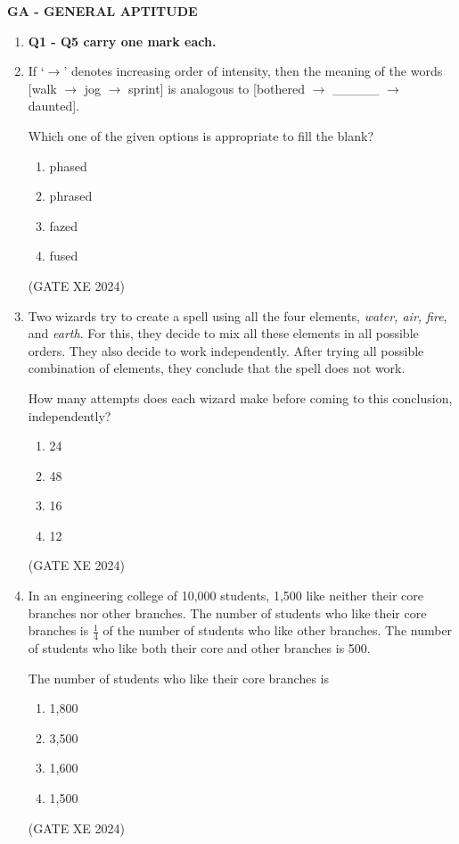 \documentclass[12pt]{article}
\begin{document}
\begin{center}
    {\Large \textbf{GA - GENERAL APTITUDE}}
\end{center}



\begin{enumerate}

\item[] \textbf{Q1 - Q5 carry one mark each.}
\item If `$\rightarrow$' denotes increasing order of intensity, then the meaning of the words [walk $\rightarrow$ jog $\rightarrow$ sprint] is analogous to [bothered $\rightarrow$ \_\_\_\_\_ $\rightarrow$ daunted].  

Which one of the given options is appropriate to fill the blank?
\begin{enumerate}
\item phased
\item phrased
\item fazed
\item fused
\end{enumerate}
(GATE XE 2024)

\item Two wizards try to create a spell using all the four elements, \textit{water, air, fire}, and \textit{earth}. For this, they decide to mix all these elements in all possible orders. They also decide to work independently. After trying all possible combination of elements, they conclude that the spell does not work.  

How many attempts does each wizard make before coming to this conclusion, independently?
\begin{enumerate}
\item 24
\item 48
\item 16
\item 12
\end{enumerate}
(GATE XE 2024)

\item In an engineering college of 10,000 students, 1,500 like neither their core branches nor other branches. The number of students who like their core branches is $\tfrac{1}{4}$ of the number of students who like other branches. The number of students who like both their core and other branches is 500.  

The number of students who like their core branches is
\begin{enumerate}
\item 1,800
\item 3,500
\item 1,600
\item 1,500
\end{enumerate}
(GATE XE 2024)


\end{enumerate}
\end{document}
